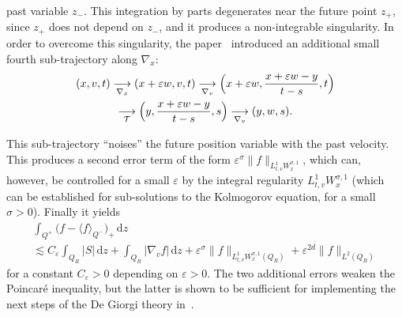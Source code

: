 \documentclass[JEP,XML,SOM,Unicode,NoFloatCountersInSection,published]{cedram}
\theoremstyle{definition}
\newcommand{\cT}{{\mathcal T}}
\newcommand{\dd}{{\, \mathrm d}}
\let\var\varepsilon
\begin{document}
past variable $z_-$. This integration by parts degenerates near
the future point $z_+$, since $z_+$ does not depend on $z_-$, and
it produces a non-integrable singularity. In order to overcome
this singularity, the paper~\cite{guerand-mouhot} introduced an
additional small fourth sub-trajectory along $\nabla_x$:
\begin{multline*}
(x,v,t)
\underset{\nabla_x}{\longrightarrow}
(x+\varepsilon w,v,t) \underset{\nabla_v}{\longrightarrow}
\Bigl(x+\varepsilon w, \frac{x+\varepsilon w
-y}{t-s},t \Bigr) \\
\underset{\cT}{\longrightarrow} \Bigl(y,\frac{x+\varepsilon w
-y}{t-s},s\Bigr) \underset{\nabla_v}{\longrightarrow}
(y,w,s).
\end{multline*}

This sub-trajectory ``noises'' the future position variable with
the past velocity. This produces a second error term of the form
$\var^\sigma \| f \|_{L^1_{t,v} W^{\sigma,1}_x}$, which can, however,
be controlled for a small $\var$ by the
integral regularity $L^1_{t,v} W^{\sigma,1}_{x}$ (which can be
established for sub-solutions to the Kolmogorov equation, for a
small $\sigma>0$). Finally it
yields
\begin{multline*}
\int_{Q^+} \big(f - \langle
f\rangle_{Q^-}\big)_+ \dd z\\
\lesssim
C_\var \int_{Q_R} \big\vert S\big\vert \dd z +
\int_{Q_R} \big\vert \nabla_v f\big\vert \dd z + \var^\sigma \| f
\|_{L^1_{t,v} W^{\sigma,1}_x(Q_R)} + \var^{2d} \|f\|_{L^2(Q_R)}
\end{multline*}
for a constant $C_\var >0$ depending on $\var>0$. The two
additional errors weaken the Poincaré inequality, but the latter
is shown to be sufficient for implementing the next steps of the
De Giorgi theory in~\cite{guerand-mouhot}.
\end{document}
